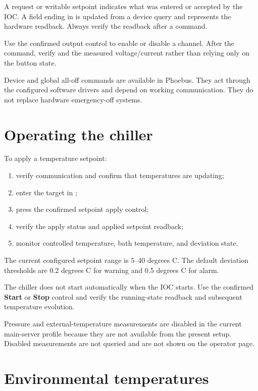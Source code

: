 \begin{importantbox}
A request or writable setpoint indicates what was entered or accepted by the IOC. A field ending in  is updated from a device query and represents the hardware readback. Always verify the readback after a command.
\end{importantbox}

Use the confirmed output control to enable or disable a channel. After the command, verify  and the measured voltage/current rather than relying only on the button state.

Device and global all-off commands are available in Phoebus. They act through the configured software drivers and depend on working communication. They do not replace hardware emergency-off systems.

\section{Operating the chiller}

To apply a temperature setpoint:

\begin{enumerate}
  \item verify communication and confirm that temperatures are updating;
  \item enter the target in ;
  \item press the confirmed setpoint apply control;
  \item verify the apply status and applied setpoint readback;
  \item monitor controlled temperature, bath temperature, and deviation state.
\end{enumerate}

The current configured setpoint range is 5--40 degrees C. The default deviation thresholds are 0.2 degrees C for warning and 0.5 degrees C for alarm.

The chiller does not start automatically when the IOC starts. Use the confirmed \textbf{Start} or \textbf{Stop} control and verify the running-state readback and subsequent temperature evolution.

Pressure and external-temperature measurements are disabled in the current main-server profile because they are not available from the present setup. Disabled measurements are not queried and are not shown on the operator page.

\section{Environmental temperatures}


